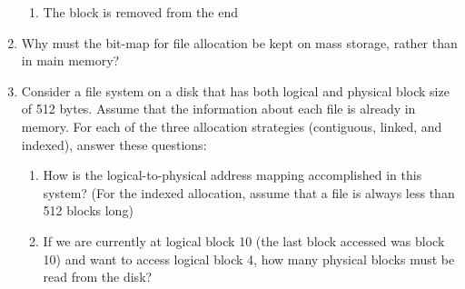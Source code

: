 \documentclass{article}
\begin{document}
\begin{enumerate}
\begin{enumerate}
			\item The block is removed from the end
		\end{enumerate}
		\item Why must the bit-map for file allocation be kept on mass storage, rather than in main memory?
		\item Consider a file system on a disk that has both logical and physical block size of 512 bytes. Assume that the information about each file is already in memory. For each of the three allocation strategies (contiguous, linked, and indexed), answer these questions:
		\begin{enumerate}
			\item How is the logical-to-physical address mapping accomplished in this system? (For the indexed allocation, assume that a file is always less than 512 blocks long)
			\item If we are currently at logical block 10 (the last block accessed was block 10) and want to access logical block 4, how many physical blocks must be read from the disk?
		\end{enumerate}

	\end{enumerate}
\end{document}
